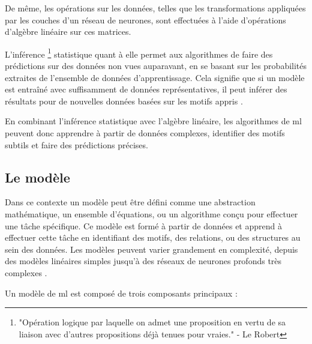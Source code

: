 De même, les opérations sur les données, telles que les transformations appliquées par les couches d'un réseau de neurones, sont effectuées à l'aide d'opérations d'algèbre linéaire sur ces matrices.

L'inférence \footnote{"Opération logique par laquelle on admet une proposition en vertu de sa liaison avec d'autres propositions déjà tenues pour vraies." - Le Robert} statistique quant à elle permet aux algorithmes de faire des prédictions sur des données non vues auparavant, en se basant sur les probabilités extraites de l'ensemble de données d'apprentissage. Cela signifie que si un modèle est entraîné avec suffisamment de données représentatives, il peut inférer des résultats pour de nouvelles données basées sur les motifs appris \cite{Deisenroth_Faisal_Ong_2020}.

En combinant l'inférence statistique avec l'algèbre linéaire, les algorithmes de \ac{ml} peuvent donc apprendre à partir de données complexes, identifier des motifs subtils et faire des prédictions précises.  

\subsection{Le modèle}

Dans ce contexte un modèle peut être défini comme une abstraction mathématique, un ensemble d'équations, ou un algorithme conçu pour effectuer une tâche spécifique. Ce modèle est formé à partir de données et apprend à effectuer cette tâche en identifiant des motifs, des relations, ou des structures au sein des données. Les modèles peuvent varier grandement en complexité, depuis des modèles linéaires simples jusqu'à des réseaux de neurones profonds très complexes \cite{Deisenroth_Faisal_Ong_2020}.

Un modèle de \ac{ml} est composé de trois composants principaux :

